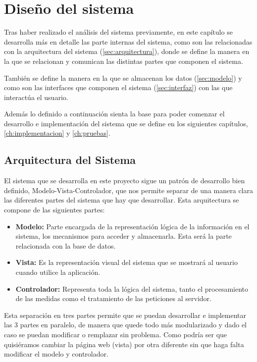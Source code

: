 \chapter{Diseño del sistema}
\label{ch:diseno}
Tras haber realizado el análisis del sistema previamente, en este capítulo se desarrolla más en detalle las parte internas del sistema, como son las relacionadas con la arquitectura del sistema (\autoref{sec:arquitectura}), donde se define la manera en la que se relacionan y comunican las distintas partes que componen el sistema. 

También se define la manera en la que se almacenan los datos (\autoref{sec:modelo}) y como son las interfaces que componen el sistema (\autoref{sec:interfaz}) con las que interactúa el usuario. 

Además lo definido a continuación sienta la base para poder comenzar el desarrollo e implementación del sistema que se define en los siguientes capítulos, \autoref{ch:implementacion} y \autoref{ch:pruebas}.

\section{Arquitectura del Sistema}\label{sec:arquitectura}
El sistema que se desarrolla en este proyecto sigue un patrón de desarrollo bien definido, Modelo-Vista-Controlador, que nos permite separar de una manera clara las diferentes partes del sistema que hay que desarrollar. Esta arquitectura se compone de las siguientes partes:
\begin{itemize}
    \item \textbf{Modelo:} Parte encargada de la representación lógica de la información en el sistema, los mecanismos para acceder y almacenarla. Esta será la parte relacionada con la base de datos.
    \item \textbf{Vista:} Es la representación visual del sistema que se mostrará al usuario cuando utilice la aplicación.
    \item \textbf{Controlador:} Representa toda la lógica del sistema, tanto el procesamiento de las medidas como el tratamiento de las peticiones al servidor.
\end{itemize}

Esta separación en tres partes permite que se puedan desarrollar e implementar las 3 partes en paralelo, de manera que quede todo más modularizado y dado el caso se puedan modificar o remplazar sin problema. Como podría ser que quisiéramos cambiar la página web (vista) por otra diferente sin que haga falta modificar el modelo y controlador. 

